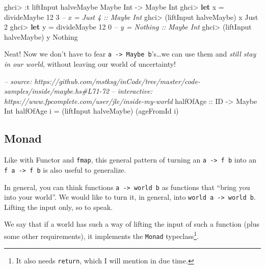 \documentclass[]{article}
\newenvironment{Shaded}{}{}
\newcommand{\KeywordTok}[1]{\textcolor[rgb]{0.00,0.44,0.13}{\textbf{{#1}}}}
\newcommand{\DataTypeTok}[1]{\textcolor[rgb]{0.56,0.13,0.00}{{#1}}}
\newcommand{\DecValTok}[1]{\textcolor[rgb]{0.25,0.63,0.44}{{#1}}}
\newcommand{\CommentTok}[1]{\textcolor[rgb]{0.38,0.63,0.69}{\textit{{#1}}}}
\newcommand{\OtherTok}[1]{\textcolor[rgb]{0.00,0.44,0.13}{{#1}}}
\newcommand{\FunctionTok}[1]{\textcolor[rgb]{0.02,0.16,0.49}{{#1}}}
\newcommand{\NormalTok}[1]{{#1}}
\begin{document}
\begin{Shaded}
\begin{Highlighting}[]
\NormalTok{ghci}\FunctionTok{>} \FunctionTok{:}\NormalTok{t liftInput halveMaybe}
\DataTypeTok{Maybe} \DataTypeTok{Int} \OtherTok{->} \DataTypeTok{Maybe} \DataTypeTok{Int}
\NormalTok{ghci}\FunctionTok{>} \KeywordTok{let} \NormalTok{x }\FunctionTok{=} \NormalTok{divideMaybe }\DecValTok{12} \DecValTok{3}     \CommentTok{-- x = Just 4 :: Maybe Int}
\NormalTok{ghci}\FunctionTok{>} \NormalTok{(liftInput halveMaybe) x}
\DataTypeTok{Just} \DecValTok{2}
\NormalTok{ghci}\FunctionTok{>} \KeywordTok{let} \NormalTok{y }\FunctionTok{=} \NormalTok{divideMaybe }\DecValTok{12} \DecValTok{0}     \CommentTok{-- y = Nothing :: Maybe Int}
\NormalTok{ghci}\FunctionTok{>} \NormalTok{(liftInput halveMaybe) y}
\DataTypeTok{Nothing}
\end{Highlighting}
\end{Shaded}

Neat! Now we don't have to fear
\texttt{a\ -\textgreater{}\ Maybe\ b}'s\ldots{}we can use them and
\emph{still stay in our world}, without leaving our world of
uncertainty!

\begin{Shaded}
\begin{Highlighting}[]
\CommentTok{-- source: https://github.com/mstksg/inCode/tree/master/code-samples/inside/maybe.hs#L71-72}
\CommentTok{-- interactive: https://www.fpcomplete.com/user/jle/inside-my-world}
\OtherTok{halfOfAge ::} \DataTypeTok{ID} \OtherTok{->} \DataTypeTok{Maybe} \DataTypeTok{Int}
\NormalTok{halfOfAge i }\FunctionTok{=} \NormalTok{(liftInput halveMaybe) (ageFromId i)}
\end{Highlighting}
\end{Shaded}

\subsection{Monad}\label{monad}

Like with Functor and \texttt{fmap}, this general pattern of turning an
\texttt{a\ -\textgreater{}\ f\ b} into an
\texttt{f\ a\ -\textgreater{}\ f\ b} is also useful to generalize.

In general, you can think functions
\texttt{a\ -\textgreater{}\ world\ b} as functions that ``bring you into
your world''. We would like to turn it, in general, into
\texttt{world\ a\ -\textgreater{}\ world\ b}. Lifting the input only, so
to speak.

We say that if a world has such a way of lifting the input of such a
function (plus some other requirements), it implements the
\texttt{Monad} typeclass\footnote{It also needs \texttt{return}, which I
  will mention in due time.}.
\end{document}
